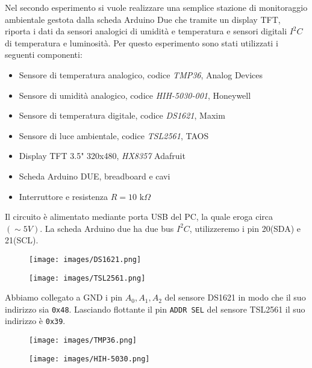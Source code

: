 Nel secondo esperimento si vuole realizzare una semplice stazione di monitoraggio ambientale gestota dalla scheda Arduino Due che tramite un display TFT, riporta i dati da sensori analogici di umidità e temperatura e sensori digitali $I^2C$ di temperatura e luminosità. Per questo esperimento sono stati utilizzati i seguenti componenti:
\begin{itemize}
    \item Sensore di temperatura analogico, codice \textit{TMP36}, Analog Devices
    \item Sensore di umidità analogico, codice \textit{HIH-5030-001}, Honeywell
    \item Sensore di temperatura digitale, codice \textit{DS1621}, Maxim
    \item Sensore di luce ambientale, codice \textit{TSL2561}, TAOS
    \item Display TFT 3.5" 320x480, \textit{HX8357} Adafruit
    \item Scheda Arduino DUE, breadboard e cavi
    \item Interruttore e resistenza $R=10\text{ k}\Omega$
\end{itemize}
Il circuito è alimentato mediante porta USB del PC, la quale eroga circa $(\sim 5 V)$. La scheda Arduino due ha due bus $I^2C$, utilizzeremo i pin 20(SDA) e 21(SCL).
\begin{figure}[H]
    \centering
    \begin{minipage}{.5\textwidth}
      \centering
      \texttt{[image: images/DS1621.png]}
      \label{fig:DS1621}
    \end{minipage}%
    \begin{minipage}{.5\textwidth}
      \centering
      \texttt{[image: images/TSL2561.png]}
      \label{fig:TSL2561}
    \end{minipage}
\end{figure}
Abbiamo collegato a GND i pin $A_0,A_1,A_2$ del sensore DS1621 in modo che il suo indirizzo sia \texttt{0x48}. Lasciando flottante il pin \texttt{ADDR SEL} del sensore TSL2561 il suo indirizzo è \texttt{0x39}.
\begin{figure}[H]
    \centering
    \begin{minipage}{.5\textwidth}
      \centering
      \texttt{[image: images/TMP36.png]}
      \label{fig:DS1621}
    \end{minipage}%
    \begin{minipage}{.5\textwidth}
      \centering
      \texttt{[image: images/HIH-5030.png]}
      \label{fig:TSL2561}
    \end{minipage}
\end{figure}
